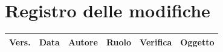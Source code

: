 \documentclass[a4paper,12pt]{article}
\begin{document}
    

    \section*{Registro delle modifiche} {
        \begin{table}[h!]
                \begin{tabularx}{\textwidth}{|l|l|l|l|L|L|}
                \hline
                \textbf{Vers.} & \textbf{Data} & \textbf{Autore} & \textbf{Ruolo} & \textbf{Verifica} & \textbf{Oggetto} \\
                \hline
            \end{tabularx}
        \end{table}
    }
    \newpage
    
    \tableofcontents
    \newpage

    \listoffigures
    \newpage
    
    \listoftables
    \newpage
\end{document}
